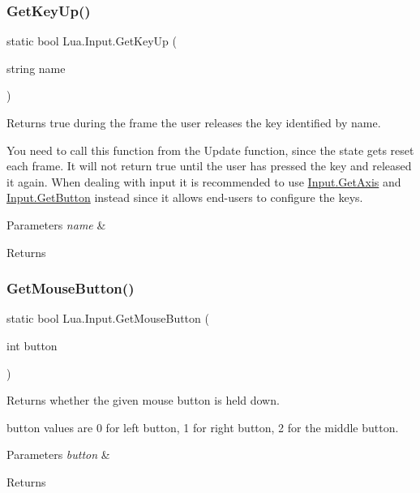 \subsubsection{\texorpdfstring{GetKeyUp()}{GetKeyUp()}}
{\footnotesize\ttfamily static bool Lua.\+Input.\+Get\+Key\+Up (\begin{DoxyParamCaption}\item[{string}]{name }\end{DoxyParamCaption})\hspace{0.3cm}{\ttfamily [static]}}



Returns true during the frame the user releases the key identified by name. 

You need to call this function from the Update function, since the state gets reset each frame. It will not return true until the user has pressed the key and released it again. When dealing with input it is recommended to use \mbox{\hyperlink{class_lua_1_1_input_a616e22e4f3b9c973c9763c10dc495395}{Input.\+Get\+Axis}} and \mbox{\hyperlink{class_lua_1_1_input_ac45bfbc1aaa71822f9dd32ee446e3e26}{Input.\+Get\+Button}} instead since it allows end-\/users to configure the keys. 
\begin{DoxyParams}{Parameters}
{\em name} & \\
\hline
\end{DoxyParams}
\begin{DoxyReturn}{Returns}

\end{DoxyReturn}
\mbox{\label{class_lua_1_1_input_a40addbec8d9b18f0dc0cb101edc38b8d}} 
\subsubsection{\texorpdfstring{GetMouseButton()}{GetMouseButton()}}
{\footnotesize\ttfamily static bool Lua.\+Input.\+Get\+Mouse\+Button (\begin{DoxyParamCaption}\item[{int}]{button }\end{DoxyParamCaption})\hspace{0.3cm}{\ttfamily [static]}}



Returns whether the given mouse button is held down. 

button values are 0 for left button, 1 for right button, 2 for the middle button. 
\begin{DoxyParams}{Parameters}
{\em button} & \\
\hline
\end{DoxyParams}
\begin{DoxyReturn}{Returns}

\end{DoxyReturn}
\mbox{\label{class_lua_1_1_input_a1a6498f2fab91a72642ac064359edef7}} 
